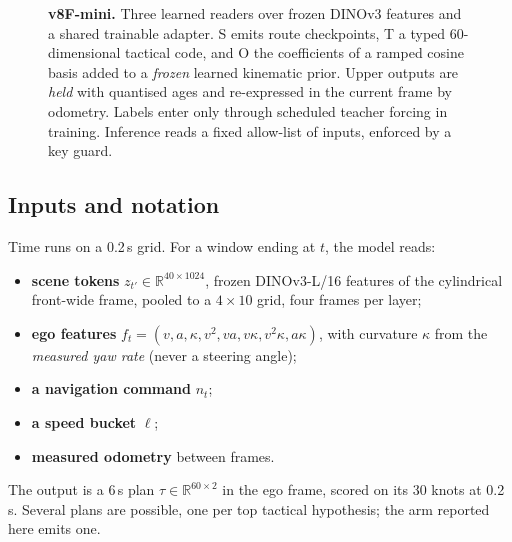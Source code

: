 \documentclass[10pt,twocolumn]{article}
\theoremstyle{remark}
\newcommand{\Rset}{\mathbb{R}}
\begin{document}
\begin{figure}[t]
{}
\caption{\textbf{v8F-mini.} Three learned readers over frozen DINOv3 features and a shared trainable adapter. S emits route checkpoints,
T a typed 60-dimensional tactical code, and O the coefficients of a ramped cosine basis added to a \emph{frozen} learned kinematic
prior. Upper outputs are \emph{held} with quantised ages and re-expressed in the current frame by odometry. Labels enter only through
scheduled teacher forcing in training. Inference reads a fixed allow-list of inputs, enforced by a key guard.}
\label{fig:v8f}
\end{figure}

\subsection{Inputs and notation}
Time runs on a 0.2\,s grid. For a window ending at $t$, the model reads:
\begin{itemize}
  \item \textbf{scene tokens} $z_{t'}\in\Rset^{40\times1024}$, frozen DINOv3-L/16 features of the cylindrical front-wide frame, pooled to a
        $4\times10$ grid, four frames per layer;
  \item \textbf{ego features} $f_t=(v,a,\kappa,v^2,va,v\kappa,v^2\kappa,a\kappa)$, with curvature $\kappa$ from the \emph{measured yaw rate}
        (never a steering angle);
  \item \textbf{a navigation command} $n_t$;
  \item \textbf{a speed bucket} $\ell$;
  \item \textbf{measured odometry} between frames.
\end{itemize}
The output is a 6\,s plan $\tau\in\Rset^{60\times2}$ in the ego frame, scored on its 30 knots at 0.2\,s. Several plans are possible,
one per top tactical hypothesis; the arm reported here emits one.
\end{document}
